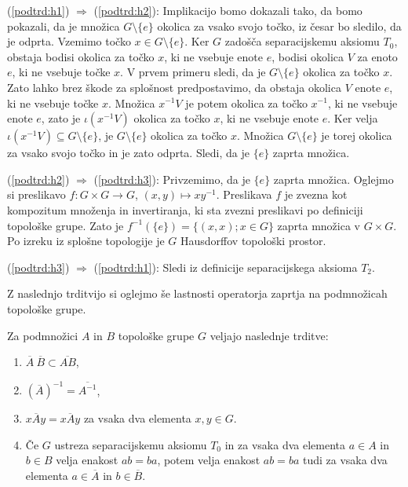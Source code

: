 \documentclass[mat1]{fmfdelo}
\newcommand{\closure}[1]{\overline{#1}}
\begin{document}
\begin{dokaz}
	(\ref{podtrd:h1}) $\Rightarrow$ (\ref{podtrd:h2}):
	Implikacijo bomo dokazali tako, da bomo pokazali, da je množica $G\setminus\lbrace e \rbrace$ okolica za vsako svojo točko, iz česar bo sledilo, da je odprta.
	Vzemimo točko $x \in G\setminus\lbrace e \rbrace$. Ker $G$ zadošča separacijskemu aksiomu $T_0$, obstaja bodisi okolica za točko $x$, ki ne vsebuje enote $e$, bodisi okolica $V$ za enoto $e$, ki ne vsebuje točke $x$. V prvem primeru sledi, da je $G\setminus\lbrace e \rbrace$ okolica za točko $x$.
	Zato lahko brez škode za splošnost predpostavimo, da obstaja okolica $V$ enote $e$, ki ne vsebuje točke $x$. Množica $x^{-1}V$ je potem okolica za točko $x^{-1}$, ki ne vsebuje enote $e$, zato je $\iota(x^{-1}V)$ okolica za točko $x$, ki ne vsebuje enote $e$. Ker velja $\iota(x^{-1}V) \subseteq G \setminus \lbrace e \rbrace$, je $G\setminus\lbrace e \rbrace$ okolica za točko $x$.
	Množica $G\setminus\lbrace e \rbrace$ je torej okolica za vsako svojo točko in je zato odprta. Sledi, da je $\lbrace e \rbrace$ zaprta množica.
	
	
	(\ref{podtrd:h2}) $\Rightarrow$ (\ref{podtrd:h3}):
	Privzemimo, da je $\lbrace e \rbrace$ zaprta množica. Oglejmo si preslikavo $f\colon G \times G \to G$, $(x, y) \mapsto xy^{-1}$. Preslikava $f$ je zvezna kot kompozitum množenja in invertiranja, ki sta zvezni preslikavi po definiciji topološke grupe. Zato je $f^{-1}(\lbrace e \rbrace) = \lbrace (x, x) ; x \in G \rbrace$ zaprta množica v $G \times G$. Po izreku iz splošne topologije je $G$ Hausdorffov topološki prostor.
	
	(\ref{podtrd:h3}) $\Rightarrow$ (\ref{podtrd:h1}):
	Sledi iz definicije separacijskega aksioma $T_2$.
\end{dokaz}

Z naslednjo trditvijo si oglejmo še lastnosti operatorja zaprtja na podmnožicah topološke grupe.
\begin{trditev}\label{trd:zaprtost}
	Za podmnožici $A$ in $B$ topološke grupe $G$ veljajo naslednje trditve:
	\begin{enumerate}
		\item $\closure{A}\ \closure{B} \subset \closure{A B}$,\label{podtrd:zap1}
		\item $(\closure{A})^{-1} = \closure{A^{-1}}$,\label{podtrd:zap2}
		\item $x \closure{A} y = \closure{x A y}$ za vsaka dva elementa $x, y \in G$.\label{podtrd:zap3}
		
		\item Če $G$ ustreza separacijskemu aksiomu $T_0$ in za vsaka dva elementa $a \in A$ in $b \in B$ velja enakost $ab = ba$, potem velja enakost $ab = ba$ tudi za vsaka dva elementa $a \in \closure{A}$ in $b \in \closure{B}$.\label{podtrd:zap4}
	\end{enumerate}
\end{trditev}
\end{document}
